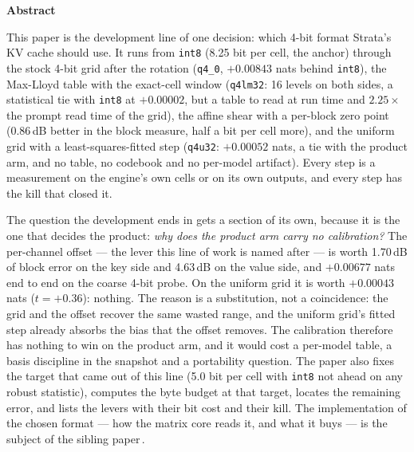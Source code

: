 \documentclass[10pt,twocolumn]{article}
\newcommand{\twod}[1]{\ifnum#1<10 0\fi\number#1}
\newcommand{\buildstamp}{\number\year-\twod{\month}-\twod{\day}, \twod{\bsthour}:\twod{\bstminute} CET}
\begin{document}
\twocolumn[{%
  \begin{center}
    {\LARGE\bfseries From int8 to a Uniform Grid\par}
    \vspace{0.6em}
    {\large How Strata's 4-bit KV cache was chosen, and why the product arm carries no calibration\par}
    \vspace{1.0em}
    {\large Matthias Kronenberger\par}
    \vspace{0.35em}
    {\small Version 1.0 \,\textperiodcentered\, built \buildstamp\ \,\textperiodcentered\, first version 2026-10-25\par}
  \end{center}
  \vspace{1.0em}
}]

\noindent\textbf{Abstract}\par
\vspace{0.6ex}
\noindent
This paper is the development line of one decision: which 4-bit format Strata's KV cache should use. It
runs from \texttt{int8} (8.25 bit per cell, the anchor) through the stock 4-bit grid after the rotation
(\texttt{q4\_0}, $+0.00843$ nats behind \texttt{int8}), the Max-Lloyd table with the exact-cell window
(\texttt{q4lm32}: 16 levels on both sides, a statistical tie with \texttt{int8} at $+0.00002$, but a table to
read at run time and $2.25\times$ the prompt read time of the grid), the affine shear with a per-block zero
point (0.86\,dB better in the block measure, half a bit per cell more), and the uniform grid with a
least-squares-fitted step (\texttt{q4u32}: $+0.00052$ nats, a tie with the product arm, and no table, no
codebook and no per-model artifact). Every step is a measurement on the engine's own cells or on its own
outputs, and every step has the kill that closed it.

The question the development ends in gets a section of its own, because it is the one that decides the
product: \emph{why does the product arm carry no calibration?} The per-channel offset --- the lever this line
of work is named after --- is worth 1.70\,dB of block error on the key side and 4.63\,dB on the value side,
and $+0.00677$ nats end to end on the coarse 4-bit probe. On the uniform grid it is worth $+0.00043$ nats
($t = +0.36$): nothing. The reason is a substitution, not a coincidence: the grid and the offset recover the
same wasted range, and the uniform grid's fitted step already absorbs the bias that the offset removes. The
calibration therefore has nothing to win on the product arm, and it would cost a per-model table, a basis
discipline in the snapshot and a portability question. The paper also fixes the target that came out of this
line (5.0 bit per cell with \texttt{int8} not ahead on any robust statistic), computes the byte budget at
that target, locates the remaining error, and lists the levers with their bit cost and their kill. The
implementation of the chosen format --- how the matrix core reads it, and what it buys --- is the subject of
the sibling paper\,\cite{q4u32paper}.
\par\medskip
\end{document}
